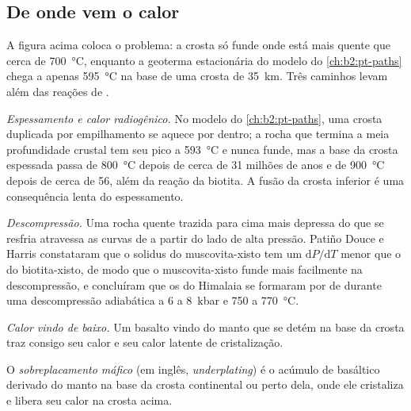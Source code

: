\subsection*{De onde vem o calor}

A figura acima coloca o problema: a crosta só funde onde está mais quente que cerca de
\qty{700}{\celsius}, enquanto a geoterma estacionária do modelo do \cref{ch:b2:pt-paths}
chega a apenas \qty{595}{\celsius} na base de uma crosta de \qty{35}{km}. Três caminhos levam
além das reações de .

\emph{Espessamento e calor radiogênico.} No modelo do \cref{ch:b2:pt-paths}, uma crosta
duplicada por empilhamento se aquece por dentro; a rocha que termina a meia profundidade crustal tem seu pico a
\qty{593}{\celsius} e nunca funde, mas a base da crosta espessada passa de
\qty{800}{\celsius} depois de cerca de 31 milhões de anos e de \qty{900}{\celsius} depois de cerca de 56, além
da reação da biotita. A fusão da crosta inferior é uma consequência lenta do espessamento.

\emph{Descompressão.} Uma rocha quente trazida para cima mais depressa do que se resfria atravessa as
curvas de  a partir do lado de alta pressão. Patiño Douce e Harris constataram que
o solidus do muscovita-xisto tem um $\mathrm{d}P/\mathrm{d}T$ menor que o do
biotita-xisto, de modo que o muscovita-xisto funde mais facilmente na descompressão, e
concluíram que os  do Himalaia se formaram por  de 
durante uma descompressão adiabática a 6 a \qty{8}{kbar} e 750 a \qty{770}{\celsius}.

\emph{Calor vindo de baixo.} Um basalto vindo do manto que se detém na base da crosta traz
consigo seu calor e seu calor latente de cristalização.

\begin{definition}\label{def:b2:crustal-melting:underplating}
O \emph{sobreplacamento máfico} (em inglês, \textit{underplating}) é o acúmulo de  basáltico
derivado do manto na base da crosta continental ou perto dela, onde ele cristaliza e
libera seu calor na crosta acima.
\end{definition}

